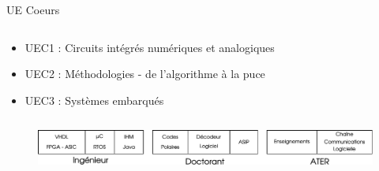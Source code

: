 \documentclass[t,compress,mathserif,12pt,xcolor=dvipsnames]{beamer}
\begin{document}
\begin{frame}[t]{UE Coeurs}
  \begin{minipage}[t][5.0cm][t]{\textwidth}
    \begin{columns}
      \begin{column}{0.63\textwidth}
        \vspace{-30pt}
        \begin{itemize}
            \item UEC1 : Circuits intégrés numériques et analogiques
            \item UEC2 : Méthodologies - de l’algorithme à la puce
            \item UEC3 : Systèmes embarqués
        \end{itemize}
      \end{column}
      \begin{column}{0.04\textwidth}

      \end{column}
      \begin{column}{0.33\textwidth}
      \end{column}
    \end{columns}
  \end{minipage}
  \begin{figure}[htp]
    \centering
    \includegraphics[width=\textwidth]{fig/frise}
  \end{figure}


\end{frame}
\end{document}
